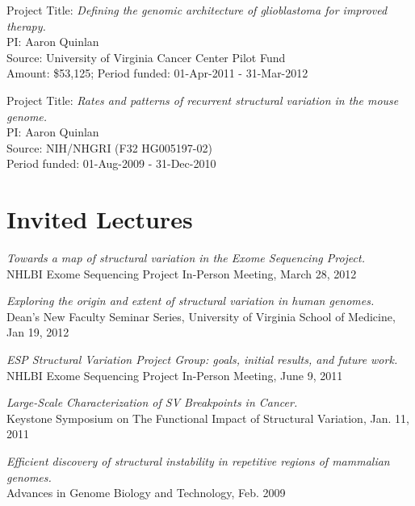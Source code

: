 \documentclass[margin,line]{cv}
\begin{document}
\begin{resume}
    \vspace{-2mm}
    Project Title: \textit{Defining the genomic architecture of glioblastoma for improved therapy.} \\
    PI: Aaron Quinlan \\
    Source: University of Virginia Cancer Center Pilot Fund\\
    Amount: \$53,125; Period funded: 01-Apr-2011 - 31-Mar-2012
    
    \vspace{-2mm}
    Project Title: \textit{Rates and patterns of recurrent structural variation in the mouse genome.}\\
    PI: Aaron Quinlan\\
    Source: NIH/NHGRI (F32 HG005197-02)\\
    Period funded: 01-Aug-2009 - 31-Dec-2010

    \section{\mysidestyle Invited Lectures}

    \textit{Towards a map of structural variation in the Exome Sequencing Project.} \\
    NHLBI Exome Sequencing Project In-Person Meeting, March 28, 2012

    \vspace{-2mm}
    \textit{Exploring the origin and extent of structural variation in human genomes.} \\
    Dean’s New Faculty Seminar Series, University of Virginia School of Medicine, Jan 19, 2012

    \vspace{-2mm}
    \textit{ESP Structural Variation Project Group: goals, initial results, and future work.} \\
    NHLBI Exome Sequencing Project In-Person Meeting, June 9, 2011
    
    \vspace{-2mm}
    \textit{Large-Scale Characterization of SV Breakpoints in Cancer.} \\
    Keystone Symposium on The Functional Impact of Structural Variation, Jan. 11, 2011

    \vspace{-2mm}
    \textit{Efficient discovery of structural instability in repetitive regions of mammalian genomes.} \\
    Advances in Genome Biology and Technology, Feb. 2009


\end{resume}
\end{document}
